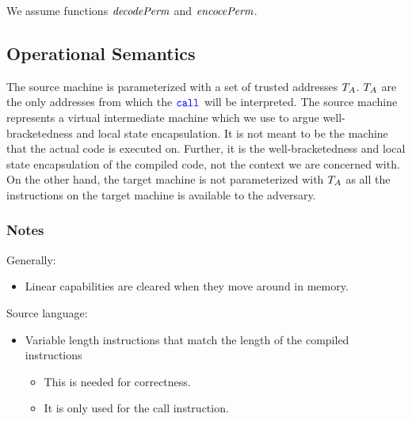 \documentclass[a4paper]{article}
\begin{document}
We assume functions $\decPerm{}$ and $\encPerm{}$.

\subsection{Operational Semantics}
The source machine is parameterized with a set of trusted addresses $T_{A}$. $T_{A}$ are the only addresses from which the $\scall{}{}{}$ will be interpreted. The source machine represents a virtual intermediate machine which we use to argue well-bracketedness and local state encapsulation. It is not meant to be the machine that the actual code is executed on. Further, it is the well-bracketedness and local state encapsulation of the compiled code, not the context we are concerned with. On the other hand, the target machine is not parameterized with $T_{A}$ as all the instructions on the target machine is available to the adversary.

\subsubsection{Notes}
Generally:
\begin{itemize}
\item Linear capabilities are cleared when they move around in memory.
\end{itemize}

Source language:
\begin{itemize}
\item Variable length instructions that match the length of the compiled instructions
  \begin{itemize}
  \item This is needed for correctness. %
  \item It is only used for the call instruction.
  \end{itemize}
\end{itemize}
\end{document}
